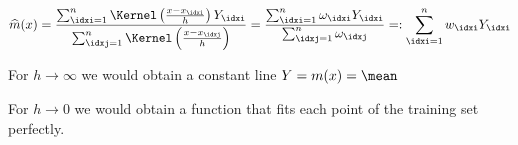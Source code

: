 \begin{defnbox}\nospacing
    \begin{defn}\label{defn:nardaya_watson_kernel_estimator}
        \begin{align}
          \widehat{m}(x)=\frac{\sum_{\idxi=1}^{n}\Kernel \left(\frac{x-x_{\idxi}}{h}\right)Y_{\idxi}}{\sum_{\idxj=1}^{n}\Kernel \left(\frac{x-x_{\idxj}}{h}\right)}=\frac{\sum_{\idxi=1}^{n}\omega_{\idxi}Y_{\idxi}}{\sum_{\idxj=1}^{n}\omega_{\idxj}}
          =:\sum_{\idxi=1}^{n}w_{\idxi}Y_{\idxi}
          \label{eq:nardaya_watson_kernel_estimator}
        \end{align}
    \end{defn}
\end{defnbox}
\begin{notebox}[Note]\nospacing
    \begin{itemizenosep}
        \item For $h\to\infty$ we would obtain a constant line $Y=m(x)=\mean$
        \item For $h\to0$ we would obtain a function that fits each point of the training set perfectly.
    \end{itemizenosep}
\end{notebox}
